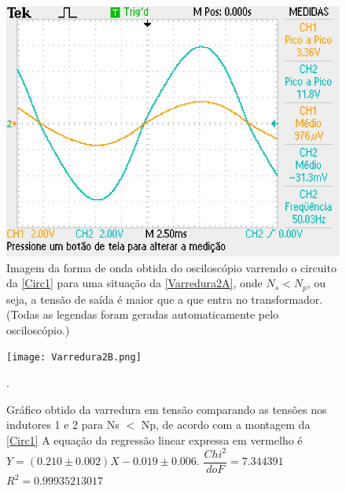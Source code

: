 \documentclass[11pt,a4paper]{article}
\begin{document}
    \newpage
    \begin{figure}[!htb]
    \centering
    \includegraphics[scale=1]{FiguraA.JPG}
    \caption{Imagem da forma de onda obtida do osciloscópio varrendo o circuito da \cref{Circ1} para uma situação da \cref{Varredura2A}, onde $N_s < N_p$, ou seja, a tensão de saída é maior que a que entra no transformador. (Todas as legendas foram geradas automaticamente pelo osciloscópio.)}
    \label{FiguraA}
    \end{figure}
    
    \begin{figure}[!htb]
    \centering
    \texttt{[image: Varredura2B.png]}
    \caption{Gráfico obtido da varredura em tensão comparando as tensões nos indutores 1 e 2 para Ns $<$ Np, de acordo com a montagem da \cref{Circ1} A equação da regressão linear expressa em vermelho é $Y = (0.210 \pm 0.002)X - 0.019 \pm 0.006$. $\dfrac{Chi^2}{doF} = 7.344391$ $R^2 = 0.99935213017$}.
    \label{Varredura2B}
    \end{figure}
    
\end{document}
